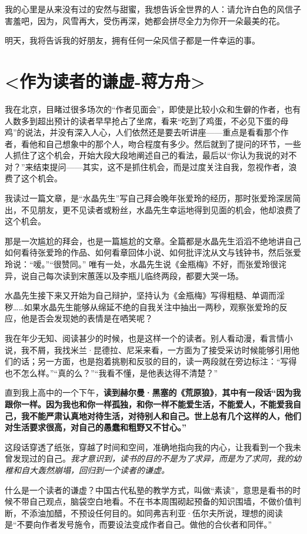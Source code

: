 \documentclass[UTF8,a4paper,8pt]{ctexart}
\begin{document}
 我的心里是从来没有过的安然与甜蜜，我想告诉全世界的人：请允许白色的风信子害羞吧，因为，风雪再大，受伤再深，她都会拼尽全力为你开一朵最美的花。
 
 明天，我将告诉我的好朋友，拥有任何一朵风信子都是一件幸运的事。
 
 
 \newpage
 \section{<作为读者的谦虚-蒋方舟>}
 我在北京，目睹过很多场次的“作者见面会”，即使是比较小众和生僻的作者，也有人数多到超出预计的读者早早抢占了坐席，看来“吃到了鸡蛋，不必见下蛋的母鸡”的说法，并没有深入人心，人们依然还是要去听讲座——重点是看看那个作者，看他和自己想象中的那个人，吻合程度有多少。然后就到了提问的环节，一些人抓住了这个机会，开始大段大段地阐述自己的看法，最后以“你认为我说的对不对？”来结束提问——其实，这不是抓住机会，而是过度关注自我，忽视作者，浪费了这个机会。
 
 我读过一篇文章，是“水晶先生”写自己拜会晚年张爱玲的经历，那时张爱玲深居简出，不见朋友，更不见读者或粉丝，水晶先生幸运地得到见面的机会，他却浪费了这个机会。
 
 那是一次尴尬的拜会，也是一篇尴尬的文章。全篇都是水晶先生滔滔不绝地讲自己如何看待张爱玲的作品、如何看章回体小说、如何批评沈从文与钱钟书，然后张爱玲说：“嗳。”“很赞同。” 唯有一处，水晶先生说《金瓶梅》不好，而张爱玲很诧异，说自己每次读到宋蕙莲以及李瓶儿临终两段，都要大哭一场。
 
 水晶先生接下来又开始为自己辩护，坚持认为《金瓶梅》写得粗糙、单调而淫秽……如果水晶先生能够从绵延不绝的自我关注中抽出一两秒，观察张爱玲的反应，他是否会发现她的表情是在哂笑呢？
 
 我在年少无知、阅读甚少的时候，也是这样一个的读者。别人看动漫，看言情小说，我不屑，我找米兰·昆德拉、尼采来看，一方面为了接受采访时候能够引用他们的话；另一方面，也是抱着挑剔和反驳的目的，读一两段就在旁边标注：“写得也不怎么样。”“真的么？”“我看不懂，是他表达得不清楚？”
 
 直到我上高中的一个下午，\textbf{读到赫尔曼·黑塞的《荒原狼》}，\textbf{其中有一段话“因为我跟你一样。因为我也和你一样孤独，和你一样不能爱生活，不能爱人，不能爱我自己，我不能严肃认真地对待生活，对待别人和自己。世上总有几个这样的人，他们对生活要求很高，对自己的愚蠢和粗野又不甘心。”}
 
 这段话穿透了纸张，穿越了时间和空间，准确地指向我的内心，让我看到一个我未曾发现过的自己。\textit{我才意识到，读书的目的不是为了求异，而是为了求同，我的幼稚和自大轰然崩塌，回归到一个读者的谦虚。}
 
 什么是一个读者的谦虚？中国古代私塾的教学方式，叫做“素读”，意思是看书的时候不带自己观点，脑袋空白地看。不在书本周围砌起预备的知识围墙，不做价值判断，不添油加醋，不预设任何目的。如同弗吉利亚·伍尔夫所说，理想的阅读是“不要向作者发号施令，而要设法变成作者自己。做他的合伙者和同伴。”
 
\end{document}
